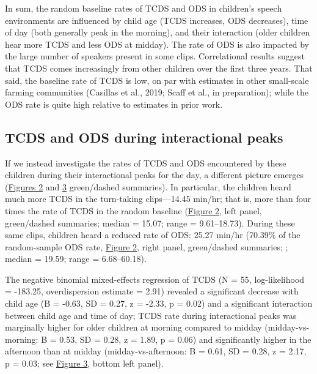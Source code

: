 \documentclass[,man,floatsintext]{apa6}
\begin{document}
In sum, the random baseline rates of TCDS and ODS in children's speech
environments are influenced by child age (TCDS increases, ODS
decreases), time of day (both generally peak in the morning), and their
interaction (older children hear more TCDS and less ODS at midday). The
rate of ODS is also impacted by the large number of speakers present in
some clips. Correlational results suggest that TCDS comes increasingly
from other children over the first three years. That said, the baseline
rate of TCDS is low, on par with estimates in other small-scale farming
communities (Casillas et al., 2019; Scaff et al., in preparation); while
the ODS rate is quite high relative to estimates in prior work.

\subsection{TCDS and ODS during interactional
peaks}\label{tcds-and-ods-during-interactional-peaks}

If we instead investigate the rates of TCDS and ODS encountered by these
children during their interactional peaks for the day, a different
picture emerges (\protect\hyperlink{fig2}{Figures 2} and
\protect\hyperlink{fig3}{3} green/dashed summaries). In particular, the
children heard much more TCDS in the turn-taking clips---14.45 min/hr;
that is, more than four times the rate of TCDS in the random baseline
(\protect\hyperlink{fig2}{Figure 2}, left panel, green/dashed summaries;
median = 15.07; range = 9.61--18.73). During these same clips, children
heard a reduced rate of ODS: 25.27 min/hr (70.39\% of the random-sample
ODS rate, \protect\hyperlink{fig2}{Figure 2}, right panel, green/dashed
summaries; ; median = 19.59; range = 6.68--60.18).

The negative binomial mixed-effects regression of TCDS (N = 55,
log-likelihood = -183.25, overdispersion estimate = 2.91) revealed a
significant decrease with child age (B = -0.63, SD = 0.27, z = -2.33, p
= 0.02) and a significant interaction between child age and time of day;
TCDS rate during interactional peaks was marginally higher for older
children at morning compared to midday (midday-vs-morning: B = 0.53, SD
= 0.28, z = 1.89, p = 0.06) and significantly higher in the afternoon
than at midday (midday-vs-afternoon: B = 0.61, SD = 0.28, z = 2.17, p =
0.03; see \protect\hyperlink{fig3}{Figure 3}, bottom left panel).
\end{document}
